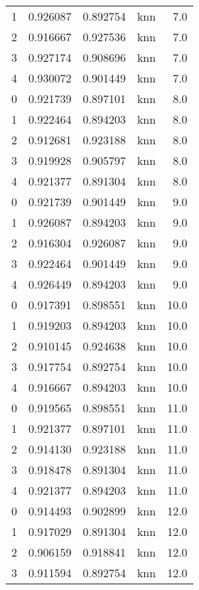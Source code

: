 \begin{tabular}{rrrlr}
     1 & 0.926087 & 0.892754 &      knn &        7.0 \\
     2 & 0.916667 & 0.927536 &      knn &        7.0 \\
     3 & 0.927174 & 0.908696 &      knn &        7.0 \\
     4 & 0.930072 & 0.901449 &      knn &        7.0 \\
     0 & 0.921739 & 0.897101 &      knn &        8.0 \\
     1 & 0.922464 & 0.894203 &      knn &        8.0 \\
     2 & 0.912681 & 0.923188 &      knn &        8.0 \\
     3 & 0.919928 & 0.905797 &      knn &        8.0 \\
     4 & 0.921377 & 0.891304 &      knn &        8.0 \\
     0 & 0.921739 & 0.901449 &      knn &        9.0 \\
     1 & 0.926087 & 0.894203 &      knn &        9.0 \\
     2 & 0.916304 & 0.926087 &      knn &        9.0 \\
     3 & 0.922464 & 0.901449 &      knn &        9.0 \\
     4 & 0.926449 & 0.894203 &      knn &        9.0 \\
     0 & 0.917391 & 0.898551 &      knn &       10.0 \\
     1 & 0.919203 & 0.894203 &      knn &       10.0 \\
     2 & 0.910145 & 0.924638 &      knn &       10.0 \\
     3 & 0.917754 & 0.892754 &      knn &       10.0 \\
     4 & 0.916667 & 0.894203 &      knn &       10.0 \\
     0 & 0.919565 & 0.898551 &      knn &       11.0 \\
     1 & 0.921377 & 0.897101 &      knn &       11.0 \\
     2 & 0.914130 & 0.923188 &      knn &       11.0 \\
     3 & 0.918478 & 0.891304 &      knn &       11.0 \\
     4 & 0.921377 & 0.894203 &      knn &       11.0 \\
     0 & 0.914493 & 0.902899 &      knn &       12.0 \\
     1 & 0.917029 & 0.891304 &      knn &       12.0 \\
     2 & 0.906159 & 0.918841 &      knn &       12.0 \\
     3 & 0.911594 & 0.892754 &      knn &       12.0 \\

\end{tabular}
